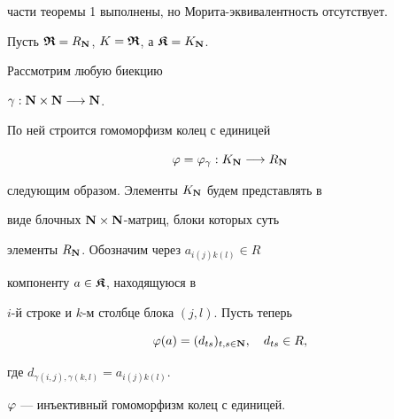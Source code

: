 части теоремы 1 выполнены, но Морита-эквивалентность отсутствует.


Пусть $\boldsymbol{\frak R}=R_{\bold N}$, $K=\boldsymbol{\frak R}$, а $\boldsymbol{\frak K}=K_{\bold N}$.


Рассмотрим любую биекцию


$\gamma: {\bold N} \times {\bold N}\longrightarrow {\bold N}$.


По ней строится гомоморфизм колец с единицей


$$


\f = \f_{\gamma}: K_{\bold N} \longrightarrow R_{\bold N}


$$


следующим образом. Элементы $K_{\bold N}$ будем представлять в


виде блочных ${\bold N} \times {\bold N}$-матриц, блоки которых суть


элементы $R_{\bold N}$. Обозначим через $a_{i(j)k(l)} \in R$


компоненту $a \in \boldsymbol{\frak K}$, находящуюся в 


$i$-й строке и $k$-м столбце блока $(j,l)$. Пусть теперь


$$


 \f(a)=(d_{t s})_{t,s \in {\bold N}},\quad d_{t s} \in R ,


$$


где $d_{\gamma(i,j),\gamma(k,l)}=a_{i(j)k(l)}$.


\medskip





\begin{lem}


$\varphi$ --- инъективный гомоморфизм колец с единицей.


\end{lem}





